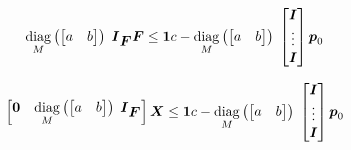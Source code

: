\begin{equation*}
    \diag{M}{\begin{bmatrix} a & b \end{bmatrix}}
    \M{I}_{\FD}
    \FD
    \le
    \M{1} c -
    \diag{M}{\begin{bmatrix} a & b \end{bmatrix}}
    \begin{bmatrix}
        \M{I} \\
        \vdots \\
        \M{I}\\
    \end{bmatrix} 
    \fp_0
\end{equation*}


\begin{equation*}
    \begin{bmatrix}
        \M{0} & \diag{M}{\begin{bmatrix} a & b \end{bmatrix}} \M{I}_{\FD}
    \end{bmatrix}
    \M{X}
    \le
    \M{1} c -
    \diag{M}{\begin{bmatrix} a & b \end{bmatrix}}
    \begin{bmatrix}
        \M{I} \\
        \vdots \\
        \M{I}\\
    \end{bmatrix} 
    \fp_0
\end{equation*}
